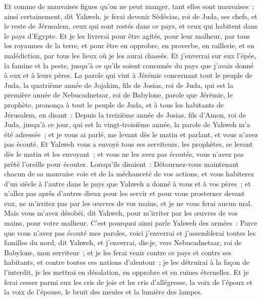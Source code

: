 \begin{multicols}{2}
Et comme de mauvaises figues qu'on ne peut manger, tant elles sont mauvaises~; ainsi certainement, dit Yahweh, je ferai devenir Sédécias, roi de Juda, ses chefs, et le reste de Jérusalem, ceux qui sont restés dans ce pays, et ceux qui habitent dans le pays d'Egypte.
Et je les livrerai pour être agités, pour leur malheur, par tous les royaumes de la terre, et pour être en opprobre, en proverbe, en raillerie, et en malédiction, par tous les lieux où je les aurai chassés.
Et j'enverrai sur eux l'épée, la famine et la peste, jusqu'à ce qu'ils soient consumés du pays que j'avais donné à eux et à leurs pères.
\VerseOne{}La parole qui vint à Jérémie concernant tout le peuple de Juda, la quatrième année de Jojakim, fils de Josias, roi de Juda, qui est la première année de Nebucadnetsar, roi de Babylone,
parole que Jérémie, le prophète, prononça à tout le peuple de Juda, et à tous les habitants de Jérusalem, en disant~:
Depuis la treizième année de Josias, fils d'Amon, roi de Juda, jusqu'à ce jour, qui est la vingt-troisième année, la parole de Yahweh m'a été adressée~; et je vous ai parlé, me levant dès le matin et parlant, et vous n'avez pas écouté.
Et Yahweh vous a envoyé tous ses serviteurs, les prophètes, se levant dès le matin et les envoyant~; et vous ne les avez pas écoutés, vous n'avez pas prêté l'oreille pour écouter.
Lorsqu'ils disaient~: Détournez-vous maintenant chacun de sa mauvaise voie et de la méchanceté de vos actions, et vous habiterez d'un siècle à l'autre dans le pays que Yahweh a donné à vous et à vos pères~;
et n'allez pas après d'autres dieux pour les servir et pour vous prosterner devant eux, ne m'irritez pas par les œuvres de vos mains, et je ne vous ferai aucun mal.
Mais vous m'avez désobéi, dit Yahweh, pour m'irriter par les œuvres de vos mains, pour votre malheur.
C'est pourquoi ainsi parle Yahweh des armées~: Parce que vous n'avez pas écouté mes paroles,
voici j'enverrai et j'assemblerai toutes les familles du nord, dit Yahweh, et j'enverrai, dis-je, vers Nebucadnetsar, roi de Babylone, mon serviteur~; et je les ferai venir contre ce pays et contre ses habitants, et contre toutes ces nations d'alentour~; je les détruirai à la façon de l'interdit, je les mettrai en désolation, en opprobre et en ruines éternelles.
Et je ferai cesser parmi eux les cris de joie et les cris d'allégresse, la voix de l'époux et la voix de l'épouse, le bruit des meules et la lumière des lampes.

\end{multicols}
